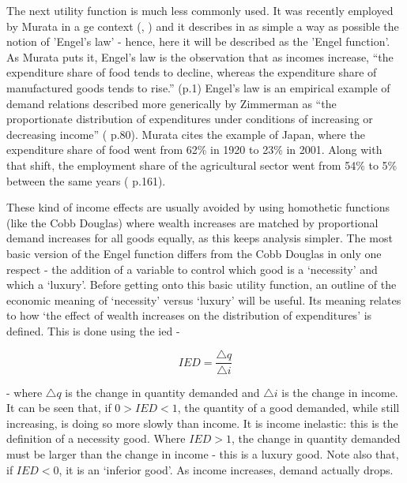 
The next utility function is much less commonly used. It was recently employed by Murata in a \gls{ge} context (\citealt{murata_rural-urban_2002}, \citealt{murata_engels_2008}) and it describes in as simple a way as possible the notion of 'Engel's law' - hence, here it will be described as the 'Engel function'. As Murata puts it, Engel's law is the observation that as incomes increase, ``the expenditure share of food tends to decline, whereas the expenditure share of manufactured goods tends to rise.'' (p.1) Engel's law is an empirical example of demand relations described more generically by Zimmerman as ``the proportionate distribution of expenditures under conditions of increasing or decreasing income'' (\citealt{zimmerman_ernst_1932} p.80). Murata cites the example of Japan, where the expenditure share of food went from 62\% in 1920 to 23\% in 2001. Along with that shift, the employment share of the agricultural sector went from 54\% to 5\% between the same years (\citealt{murata_engels_2008} p.161). 

These kind of income effects are usually avoided by using homothetic functions (like the Cobb Douglas) where wealth increases are matched by proportional demand increases for all goods equally, as this keeps analysis simpler. The most basic version of the Engel function differs from the Cobb Douglas in only one respect - the addition of a variable to control which good is a `necessity' and which a `luxury'. Before getting onto this basic utility function, an outline of the economic meaning of `necessity' versus `luxury' will be useful. Its meaning relates to how `the effect of wealth increases on the distribution of expenditures' is defined. This is done using the \gls{ied} -

\begin{equation}
IED=\frac{\triangle q}{\triangle i}
\end{equation}

 - where $\triangle q$ is the change in quantity demanded and $\triangle i$ is the change in income. It can be seen that, if $0>IED<1$, the quantity of a good demanded, while still increasing, is doing so more slowly than income. It is income inelastic: this is the definition of a necessity good. Where $IED>1$, the change in quantity demanded must be larger than the change in income - this is a luxury good. Note also that, if $IED<0$, it is an `inferior good'. As income increases, demand actually drops.
 
